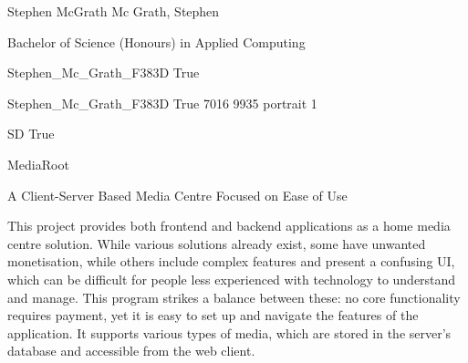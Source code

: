 \documentclass[twoside]{report}
\begin{document}
\begingroup{}\relax



\def\Key{Stephen_Mc_Grath_F383D}

{Stephen McGrath}
{Mc Grath, Stephen}

{Bachelor of Science (Honours) in Applied Computing}

{Stephen_Mc_Grath_F383D}
{True}

{Stephen_Mc_Grath_F383D}
{True}
{7016}
{9935}
{portrait}
{1}

{SD}
{True}

{MediaRoot}

{A Client-Server Based Media Centre Focused on Ease of Use}

{This project provides both frontend and backend applications as a home media centre solution. While various solutions already exist, some have unwanted monetisation, while others include complex features and present a confusing UI, which can be difficult for people less experienced with technology to understand and manage. This program strikes a balance between these: no core functionality requires payment, yet it is easy to set up and navigate the features of the application. It supports various types of media, which are stored in the server's database and accessible from the web client.}
\end{document}
